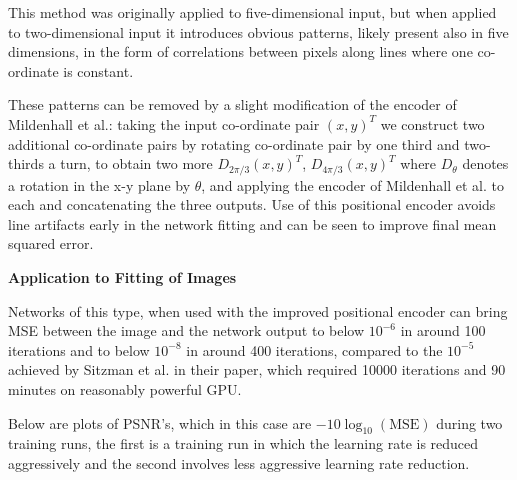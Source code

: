 \documentclass{letter}
\begin{document}
This method was originally applied to five-dimensional input, but when applied to two-dimensional input it introduces obvious patterns, likely present also in five dimensions, in the form of correlations between pixels along lines where one co-ordinate is constant.

These patterns can be removed by a slight modification of the encoder of Mildenhall et al.: taking the input co-ordinate pair $(x,y)^T$ we construct two additional co-ordinate pairs by rotating co-ordinate pair by one third and two-thirds a turn, to obtain two more $D_{2\pi/3}(x,y)^T$, $D_{4\pi/3}(x,y)^T$ where $D_\theta$ denotes a rotation in the x-y plane by $\theta$, and applying the encoder of Mildenhall et al. to each and concatenating the three outputs. Use of this positional encoder avoids line artifacts early in the network fitting and can be seen to improve final mean squared error.

\begin{center}
{\bf Application to Fitting of Images}
\end{center}

Networks of this type, when used with the improved positional encoder can bring MSE between the image and the network output to below $10^{-6}$ in around 100 iterations and to below $10^{-8}$ in around 400 iterations, compared to the $10^{-5}$ achieved by Sitzman et al. in their paper, which required 10000 iterations and 90 minutes on reasonably powerful GPU.

Below are plots of PSNR's, which in this case are $-10\log_{10}(\text{MSE})$ during two training runs, the first is a training run in which the learning rate is reduced aggressively and the second involves less aggressive learning rate reduction.
\end{document}
